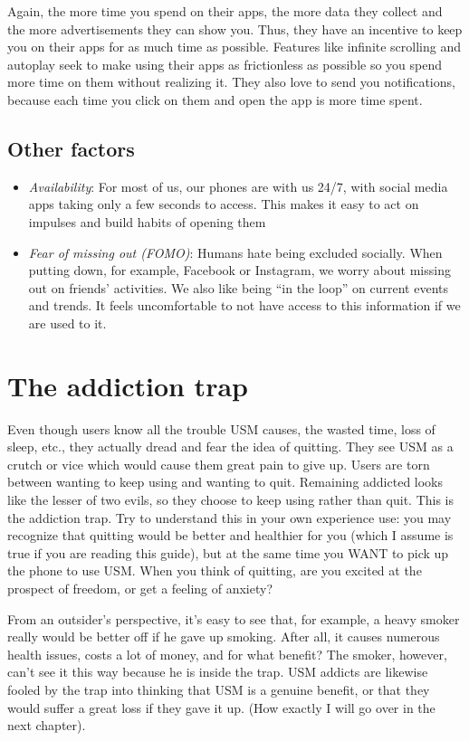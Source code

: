 \documentclass[
]{book}
\providecommand{\tightlist}{%
  \setlength{\itemsep}{0pt}\setlength{\parskip}{0pt}}
\begin{document}
Again, the more time you spend on their apps, the more data they collect and the more advertisements they can show you. Thus, they have an incentive to keep you on their apps for as much time as possible. Features like infinite scrolling and autoplay seek to make using their apps as frictionless as possible so you spend more time on them without realizing it. They also love to send you notifications, because each time you click on them and open the app is more time spent.

\section{Other factors}\label{other-factors}

\begin{itemize}
\tightlist
\item
  \emph{Availability}: For most of us, our phones are with us 24/7, with social media apps taking only a few seconds to access. This makes it easy to act on impulses and build habits of opening them
\item
  \emph{Fear of missing out (FOMO)}: Humans hate being excluded socially. When putting down, for example, Facebook or Instagram, we worry about missing out on friends' activities. We also like being ``in the loop'' on current events and trends. It feels uncomfortable to not have access to this information if we are used to it.
\end{itemize}

\chapter{The addiction trap}\label{the-addiction-trap}

Even though users know all the trouble USM causes, the wasted time, loss of sleep, etc., they actually dread and fear the idea of quitting. They see USM as a crutch or vice which would cause them great pain to give up. Users are torn between wanting to keep using and wanting to quit. Remaining addicted looks like the lesser of two evils, so they choose to keep using rather than quit. This is the addiction trap. Try to understand this in your own experience use: you may recognize that quitting would be better and healthier for you (which I assume is true if you are reading this guide), but at the same time you WANT to pick up the phone to use USM. When you think of quitting, are you excited at the prospect of freedom, or get a feeling of anxiety?

From an outsider's perspective, it's easy to see that, for example, a heavy smoker really would be better off if he gave up smoking. After all, it causes numerous health issues, costs a lot of money, and for what benefit? The smoker, however, can't see it this way because he is inside the trap. USM addicts are likewise fooled by the trap into thinking that USM is a genuine benefit, or that they would suffer a great loss if they gave it up. (How exactly I will go over in the next chapter).
\end{document}
